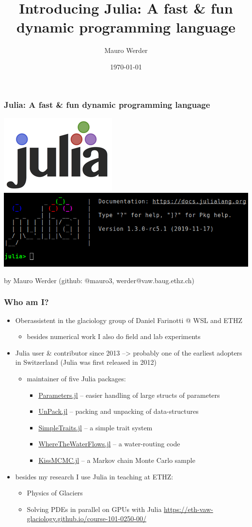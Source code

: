 \documentclass[compress,presentation,aspectratio=169]{beamer}
\author{Mauro Werder}
\date{\today}
\title{Introducing Julia: A fast \& fun dynamic programming language}
\begin{document}
\begin{frame}[fragile,label={sec:org6062e64}]{}
\frametitle{\LARGE Julia: A fast \& fun dynamic programming language}
\begin{center}
\includegraphics[width=.2\linewidth]{./figs/julia-logo.png}\quad \includegraphics[width=.3\linewidth]{./figs/julia-repl.png}
\end{center}
\vspace{2cm}
by Mauro Werder (github: @mauro3, werder@vaw.baug.ethz.ch)


\end{frame}

\begin{frame}[fragile,label={sec:org6062e64}]{}
\frametitle{Who am I?}
\begin{itemize}
\item Oberassistent in the glaciology group of Daniel Farinotti @ WSL and ETHZ
\begin{itemize}
\item besides numerical work I also do field and lab experiments
\end{itemize}
\pause
\item Julia user \& contributor since 2013
--> probably one of the earliest adopters in Switzerland
    (Julia was first released in 2012)
\begin{itemize}
\item maintainer of five Julia packages:
\begin{itemize}
\item \href{https://github.com/mauro3/Parameters.jl}{Parameters.jl} -- easier handling of large structs of parameters
\item \href{https://github.com/mauro3/UnPack.jl}{UnPack.jl} -- packing and unpacking of data-structures
\item \href{https://github.com/mauro3/SimpleTraits.jl}{SimpleTraits.jl} -- a simple trait system
\item \href{https://github.com/mauro3/WhereTheWaterFlows.jl}{WhereTheWaterFlows.jl} -- a water-routing code
\item \href{https://github.com/mauro3/KissMCMC.jl}{KissMCMC.jl} -- a Markov chain Monte Carlo sample
\end{itemize}
\end{itemize}
\item besides my research I use Julia in teaching at ETHZ:
  \begin{itemize}
  \item Physics of Glaciers
  \item Solving PDEs in parallel on GPUs with Julia
    \url{https://eth-vaw-glaciology.github.io/course-101-0250-00/}
  \end{itemize}
\end{itemize}
\end{frame}
\end{document}
